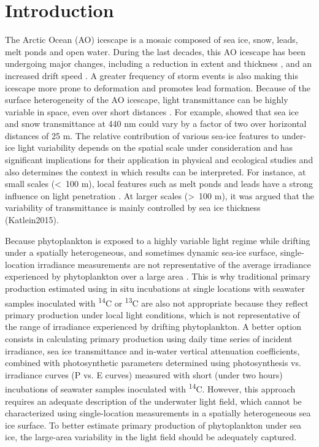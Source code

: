 \section{Introduction}

The Arctic Ocean (AO) icescape is a mosaic composed of sea ice, snow, leads, melt ponds and open water. During the last decades, this AO icescape has been undergoing major changes, including a reduction in extent and thickness \citep{Meier2014}, and an increased drift speed \citep{Kwok2013}. A greater frequency of storm events is also making this icescape more prone to deformation \citep{Itkin2017} and promotes lead formation. Because of the surface heterogeneity of the AO icescape, light transmittance can be highly variable in space, even over short distances \citep{Nicolaus2013b, Katlein2015, Hancke2018}. For example, \citet{Perovich1998} showed that sea ice and snow transmittance at 440 nm could vary by a factor of two over horizontal distances of 25 m. The relative contribution of various sea-ice features to under-ice light variability depends on the spatial scale under consideration and has significant implications for their application in physical and ecological studies and also determines the context in which results can be interpreted. For instance, at small scales (\textless~100 m), local features such as melt ponds and leads have a strong influence on light penetration \citep{Frey2011, Katlein2016, Massicotte2018}. At larger scales (\textgreater~100 m), it was argued that the variability of transmittance is mainly controlled by sea ice thickness (Katlein2015).

Because phytoplankton is exposed to a highly variable light regime while drifting under a spatially heterogeneous, and sometimes dynamic sea-ice surface, single-location irradiance measurements are not representative of the average irradiance experienced by phytoplankton over a large area \citep{Katlein2016, Lange2017}. This is why traditional primary production estimated using in situ incubations at single locations with seawater samples inoculated with \textsuperscript{14}C or \textsuperscript{13}C are also not appropriate because they reflect primary production under local light conditions, which is not representative of the range of irradiance experienced by drifting phytoplankton. A better option consists in calculating primary production using daily time series of incident irradiance, sea ice transmittance and in-water vertical attenuation coefficients, combined with photosynthetic parameters determined using photosynthesis vs. irradiance curves (P vs. E curves) measured with short (under two hours) incubations of seawater samples inoculated with \textsuperscript{14}C. However, this approach requires an adequate description of the underwater light field, which cannot be characterized using single-location measurements in a spatially heterogeneous sea ice surface. To better estimate primary production of phytoplankton under sea ice,  the large-area variability in the light field should be adequately captured.

